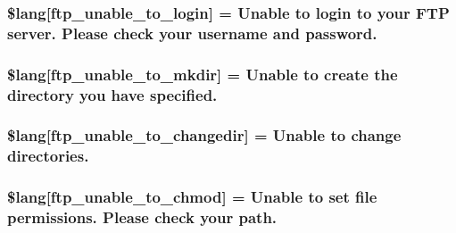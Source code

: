 \subsubsection[{\$lang}]{\setlength{\rightskip}{0pt plus 5cm}\$lang\mbox{[}\textquotesingle{}ftp\+\_\+unable\+\_\+to\+\_\+login\textquotesingle{}\mbox{]} = \textquotesingle{}Unable to login to your F\+T\+P server. Please check your username and password.\textquotesingle{}}\label{ftp__lang_8php_affe13cbf898e1802abb3cd9d9ce2db97}
\hypertarget{ftp__lang_8php_acd954089043ea7ad47397376e2630d87}{}
\subsubsection[{\$lang}]{\setlength{\rightskip}{0pt plus 5cm}\$lang\mbox{[}\textquotesingle{}ftp\+\_\+unable\+\_\+to\+\_\+mkdir\textquotesingle{}\mbox{]} = \textquotesingle{}Unable to create the directory you have specified.\textquotesingle{}}\label{ftp__lang_8php_acd954089043ea7ad47397376e2630d87}
\hypertarget{ftp__lang_8php_a2e8eab1a2d2d33cde249097df270b7df}{}
\subsubsection[{\$lang}]{\setlength{\rightskip}{0pt plus 5cm}\$lang\mbox{[}\textquotesingle{}ftp\+\_\+unable\+\_\+to\+\_\+changedir\textquotesingle{}\mbox{]} = \textquotesingle{}Unable to change directories.\textquotesingle{}}\label{ftp__lang_8php_a2e8eab1a2d2d33cde249097df270b7df}
\hypertarget{ftp__lang_8php_a9ffd10144a0dfd5a3c7ab69e4edf1fdf}{}
\subsubsection[{\$lang}]{\setlength{\rightskip}{0pt plus 5cm}\$lang\mbox{[}\textquotesingle{}ftp\+\_\+unable\+\_\+to\+\_\+chmod\textquotesingle{}\mbox{]} = \textquotesingle{}Unable to set file permissions. Please check your path.\textquotesingle{}}\label{ftp__lang_8php_a9ffd10144a0dfd5a3c7ab69e4edf1fdf}
\hypertarget{ftp__lang_8php_a1fd0c9f4e0f3be691a809ce804900ed7}{}
